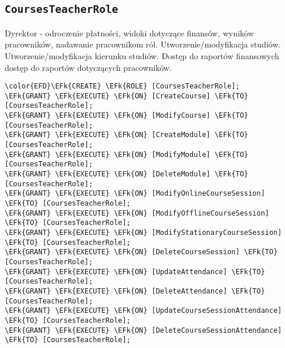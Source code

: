 \documentclass[11pt]{article}
\newcommand{\EFk}[1]{\textcolor{EFk}{\textbf{#1}}} %
\begin{document}
\subsection{\texttt{CoursesTeacherRole}}
\label{sec:orgbe54204}
Dyrektor - odroczenie płatności, widoki dotyczące finansów, wyników pracowników, nadawanie pracownikom ról. Utworzenie/modyfikacja studiów. Utworzenie/modyfikacja kierunku studiów. Dostęp do raportów finansowych dostęp do raportów dotyczących pracowników.
\begin{Code}
\begin{Verbatim}
\color{EFD}\EFk{CREATE} \EFk{ROLE} [CoursesTeacherRole];
\EFk{GRANT} \EFk{EXECUTE} \EFk{ON} [CreateCourse] \EFk{TO} [CoursesTeacherRole];
\EFk{GRANT} \EFk{EXECUTE} \EFk{ON} [ModifyCourse] \EFk{TO} [CoursesTeacherRole];
\EFk{GRANT} \EFk{EXECUTE} \EFk{ON} [CreateModule] \EFk{TO} [CoursesTeacherRole];
\EFk{GRANT} \EFk{EXECUTE} \EFk{ON} [ModifyModule] \EFk{TO} [CoursesTeacherRole];
\EFk{GRANT} \EFk{EXECUTE} \EFk{ON} [DeleteModule] \EFk{TO} [CoursesTeacherRole];
\EFk{GRANT} \EFk{EXECUTE} \EFk{ON} [ModifyOnlineCourseSession] \EFk{TO} [CoursesTeacherRole];
\EFk{GRANT} \EFk{EXECUTE} \EFk{ON} [ModifyOfflineCourseSession] \EFk{TO} [CoursesTeacherRole];
\EFk{GRANT} \EFk{EXECUTE} \EFk{ON} [ModifyStationaryCourseSession] \EFk{TO} [CoursesTeacherRole];
\EFk{GRANT} \EFk{EXECUTE} \EFk{ON} [DeleteCourseSession] \EFk{TO} [CoursesTeacherRole];
\EFk{GRANT} \EFk{EXECUTE} \EFk{ON} [UpdateAttendance] \EFk{TO} [CoursesTeacherRole];
\EFk{GRANT} \EFk{EXECUTE} \EFk{ON} [DeleteAttendance] \EFk{TO} [CoursesTeacherRole];
\EFk{GRANT} \EFk{EXECUTE} \EFk{ON} [UpdateCourseSessionAttendance] \EFk{TO} [CoursesTeacherRole];
\EFk{GRANT} \EFk{EXECUTE} \EFk{ON} [DeleteCourseSessionAttendance] \EFk{TO} [CoursesTeacherRole];
\end{Verbatim}
\end{Code}
\end{document}
